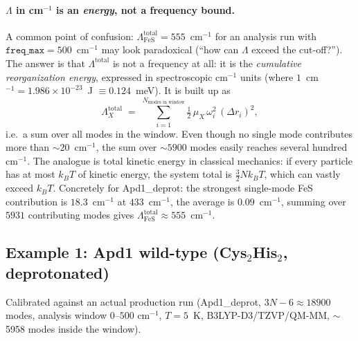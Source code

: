 \documentclass[10pt,a4paper,twoside]{article}
\newcommand{\cfgkey}[1]{\texttt{#1}}
\begin{document}
\paragraph{$\Lambda$ in cm$^{-1}$ is an \emph{energy}, not a frequency bound.}
A common point of confusion: $\Lambda_\text{FeS}^\text{total} =
555$~cm$^{-1}$ for an analysis run with
$\cfgkey{freq\_max} = 500$~cm$^{-1}$ may look paradoxical (``how
can $\Lambda$ exceed the cut-off?''). The answer is that
$\Lambda^\text{total}$ is not a frequency at all: it is the
\emph{cumulative reorganization energy}, expressed in
spectroscopic cm$^{-1}$ units (where $1$~cm$^{-1} =
1.986 \times 10^{-23}$~J $\equiv 0.124$~meV). It is built up as
\[
  \Lambda_X^\text{total}
  \;=\; \sum_{i=1}^{N_\text{modes in window}}
        \tfrac{1}{2}\,\mu_X\,\omega_i^2\,(\Delta r_i)^2 ,
\]
i.e.\ a sum over all modes in the window. Even though no single
mode contributes more than $\sim 20$~cm$^{-1}$, the sum over
$\sim 5900$ modes easily reaches several hundred cm$^{-1}$. The
analogue is total kinetic energy in classical mechanics: if every
particle has at most $k_B T$ of kinetic energy, the system total
is $\tfrac{3}{2} N k_B T$, which can vastly exceed $k_B T$.
Concretely for Apd1\_deprot: the strongest single-mode FeS
contribution is $18.3$~cm$^{-1}$ at $433$~cm$^{-1}$, the average
is $0.09$~cm$^{-1}$, summing over $5931$ contributing modes gives
$\Lambda_\text{FeS}^\text{total} \approx 555$~cm$^{-1}$.

\subsection{Example 1: Apd1 wild-type (Cys$_2$His$_2$, deprotonated)}

Calibrated against an actual production run (Apd1\_deprot,
$3N - 6 \approx 18900$ modes, analysis window $0\text{--}500$
cm$^{-1}$, $T = 5$~K, B3LYP-D3/TZVP/QM-MM, $\sim$5958 modes inside
the window).
\end{document}
